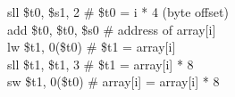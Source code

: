 \documentclass[../main.tex]{subfiles}
\begin{document}
{    \hspace*{0cm} \hspace*{0cm} sll \$t0, \$s1, 2 \hspace*{0cm} \hspace*{0cm} \hspace*{0cm} \hspace*{0cm} \hspace*{0cm} \hspace*{0cm} \hspace*{0cm} \# \$t0 = i * 4 (byte offset) \\
    \hspace*{0cm} \hspace*{0cm} add \$t0, \$t0, \$s0 \hspace*{0cm} \hspace*{0cm} \hspace*{0cm} \hspace*{0cm} \hspace*{0cm} \# address of array[i] \\
    \hspace*{0cm} \hspace*{0cm} lw \$t1, 0(\$t0) \hspace*{0cm} \hspace*{0cm} \hspace*{0cm} \hspace*{0cm} \hspace*{0cm} \hspace*{0cm} \hspace*{0cm} \hspace*{0cm} \# \$t1 = array[i] \\
    \hspace*{0cm} \hspace*{0cm} sll \$t1, \$t1, 3 \hspace*{0cm} \hspace*{0cm} \hspace*{0cm} \hspace*{0cm} \hspace*{0cm} \hspace*{0cm} \hspace*{0cm} \# \$t1 = array[i] * 8 \\
    \hspace*{0cm} \hspace*{0cm} sw \$t1, 0(\$t0) \hspace*{0cm} \hspace*{0cm} \hspace*{0cm} \hspace*{0cm} \hspace*{0cm} \hspace*{0cm} \hspace*{0cm} \hspace*{0cm} \# array[i] = array[i] * 8 \\
}
\end{document}
